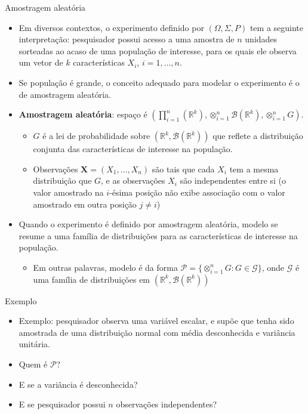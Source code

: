 \documentclass[11pt]{beamer}
\newenvironment{halfwideitemize}{\itemize\addtolength{\itemsep}{0.5em}}{\enditemize}
\begin{document}
	\begin{frame}{Amostragem aleatória}
	\begin{itemize}
		\item Em diversos contextos, o experimento definido por $(\Omega, \Sigma, P)$ tem a seguinte interpretação: pesquisador possui acesso a uma amostra de $n$ unidades sorteadas ao acaso de uma população de interesse, para os quais ele observa um vetor de $k$ características $X_i$, $i=1,\ldots, n$.
		\item Se população é {\color{blue}grande}, o conceito adequado para modelar o experimento é o de {\color{blue}amostragem aleatória}.
		\begin{halfwideitemize}
			\item \textbf{Amostragem aleatória}: espaço é $(\prod_{i=1}^n (\mathbb{R}^k), \otimes_{i=1}^n \mathcal{B}(\mathbb{R}^k), \otimes_{i=1}^n G)$.
			\begin{itemize}
								\item  $G$ é a lei de probabilidade sobre $(\mathbb{R}^k, \mathcal{B}(\mathbb{R}^k))$ que reflete a distribuição conjunta das características de interesse na população.
				\item Observações $\boldsymbol{X} = (X_1,\ldots, X_n)$ são tais que cada $X_i$ tem a mesma distribuição que $G$, e as observações $X_i$ são independentes  entre si (o valor amostrado na $i$-ésima posição não exibe associação com o valor amostrado em outra posição $j\neq i$)
			\end{itemize}
			\item Quando o experimento é definido por amostragem aleatória, modelo se resume a uma família de distribuições para as características de interesse na população.
			\begin{itemize}
				\item Em outras palavras, modelo é da forma $\mathcal{P} = \{\otimes_{i=1}^n G : G \in \mathcal{G}\}$, onde $\mathcal{G}$ é uma família de distribuições em $(\mathbb{R}^k, \mathcal{B}(\mathbb{R}^k))$
			\end{itemize}

	
		\end{halfwideitemize}
	\end{itemize}
		\end{frame}
		
		\begin{frame}{Exemplo}
		\begin{itemize}
			\item {\color{blue}Exemplo:} pesquisador observa uma variável escalar, e supõe que tenha sido amostrada de uma distribuição normal com média desconhecida e variância unitária.
			\begin{halfwideitemize}
				\item Quem é $\mathcal{P}$?
				\item E se a variância é desconhecida?
				\item E se pesquisador possui $n$ observações independentes?
			\end{halfwideitemize}
		\end{itemize}
	\end{frame}
\end{document}
